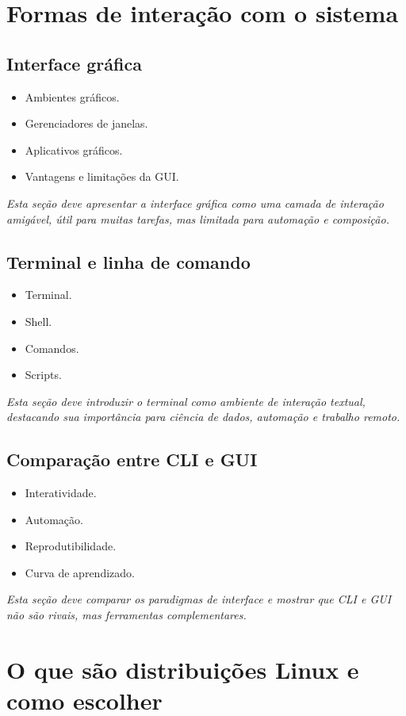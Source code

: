\documentclass[12pt,openany]{book}
\newcommand{\placeholder}[1]{
    \par\medskip
    \noindent\textit{#1}
    \par\medskip
}
\newcommand{\topicos}[1]{
    \begin{itemize}
        #1
    \end{itemize}
}
\begin{document}
\begin{refsection}
\chapter{Formas de interação com o sistema}

\section{Interface gráfica}

\topicos{
    \item Ambientes gráficos.
    \item Gerenciadores de janelas.
    \item Aplicativos gráficos.
    \item Vantagens e limitações da GUI.
}

\placeholder{Esta seção deve apresentar a interface gráfica como uma camada de interação amigável, útil para muitas tarefas, mas limitada para automação e composição.}

\section{Terminal e linha de comando}

\topicos{
    \item Terminal.
    \item Shell.
    \item Comandos.
    \item Scripts.
}

\placeholder{Esta seção deve introduzir o terminal como ambiente de interação textual, destacando sua importância para ciência de dados, automação e trabalho remoto.}

\section{Comparação entre CLI e GUI}

\topicos{
    \item Interatividade.
    \item Automação.
    \item Reprodutibilidade.
    \item Curva de aprendizado.
}

\placeholder{Esta seção deve comparar os paradigmas de interface e mostrar que CLI e GUI não são rivais, mas ferramentas complementares.}

\chapter{O que são distribuições Linux e como escolher}


\end{refsection}
\end{document}
